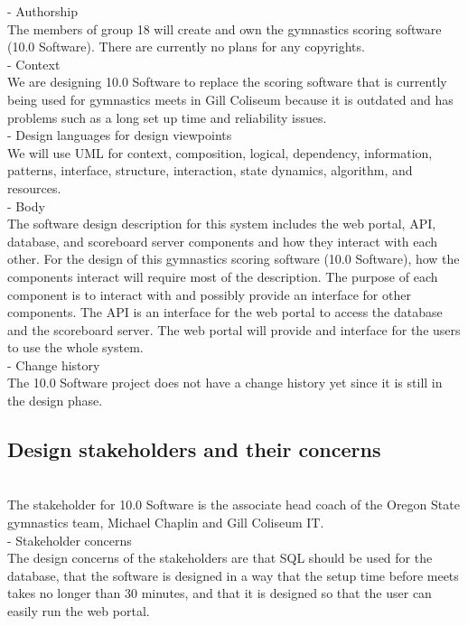 \documentclass[letterpaper,10pt,draftclsnofoot,onecolumn,]{article}
\begin{document}
- Authorship\\
The members of group 18 will create and own the gymnastics scoring software (10.0 Software). There are currently no plans for any copyrights.\\

- Context\\
We are designing 10.0 Software to replace the scoring software that is currently being used for gymnastics meets in Gill Coliseum because it is outdated and has problems such as a long set up time and reliability issues.\\

- Design languages for design viewpoints\\
We will use UML for context, composition, logical, dependency, information, patterns, interface, structure, interaction, state dynamics, algorithm, and resources.\\

- Body\\
The software design description for this system includes the web portal, API, database, and scoreboard server components and how they interact with each other. For the design of this gymnastics scoring software (10.0 Software), how the components interact will require most of the description. The purpose of each component is to interact with and possibly provide an interface for other components. The API is an interface for the web portal to access the database and the scoreboard server. The web portal will provide and interface for the users to use the whole system.\\

- Change history\\
The 10.0 Software project does not have a change history yet since it is still in the design phase.

\subsection{Design stakeholders and their concerns}
\\
The stakeholder for 10.0 Software is the associate head coach of the Oregon State gymnastics team, Michael Chaplin and Gill Coliseum IT.\\

- Stakeholder concerns\\
The design concerns of the stakeholders are that SQL should be used for the database, that the software is designed in a way that the setup time before meets takes no longer than 30 minutes, and that it is designed so that the user can easily run the web portal.\\
\end{document}
